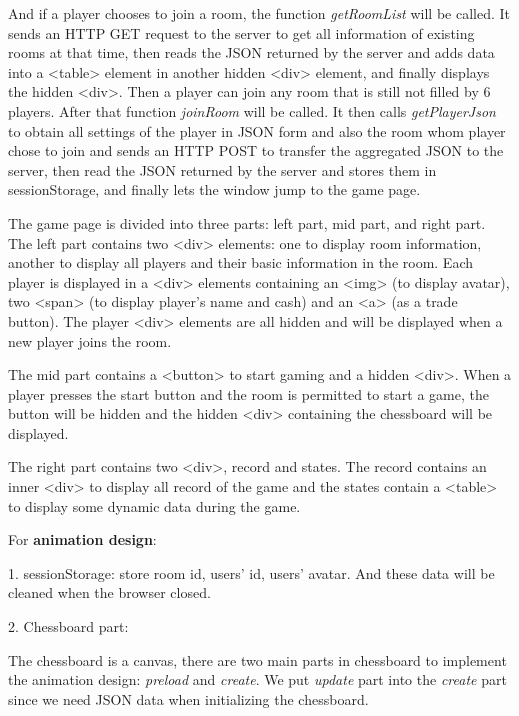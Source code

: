 \documentclass[a4paper,11pt]{article}
\begin{document}
And if a player chooses to join a room, the function \emph{getRoomList} will be called. It sends an HTTP GET request to the server to get all information of existing rooms at that time, then reads the JSON returned by the server and adds data into a \textless table\textgreater\; element in another hidden \textless div\textgreater\; element, and finally displays the hidden \textless div\textgreater\;. Then a player can join any room that is still not filled by $6$ players. After that function \emph{joinRoom} will be called. It then calls \emph{getPlayerJson} to obtain all settings of the player in JSON form and also the room whom player chose to join and sends an HTTP POST to transfer the aggregated JSON to the server, then read the JSON returned by the server and stores them in sessionStorage, and finally lets the window jump to the game page.
    
The game page is divided into three parts: left part, mid part, and right part. The left part contains two \textless div\textgreater\; elements: one to display room information, another to display all players and their basic information in the room. Each player is displayed in a \textless div\textgreater\; elements containing an \textless img\textgreater\; (to display avatar), two \textless span\textgreater\; (to display player's name and cash) and an \textless a\textgreater\; (as a trade button). The player \textless div\textgreater\; elements are all hidden and will be displayed when a new player joins the room. 

The mid part contains a \textless button\textgreater\; to start gaming and a hidden \textless div\textgreater\;. When a player presses the start button and the room is permitted to start a game, the button will be hidden and the hidden \textless div\textgreater\; containing the chessboard will be displayed. 

The right part contains two \textless div\textgreater\;, record and states. The record contains an inner \textless div\textgreater\; to display all record of the game and the states contain a \textless table\textgreater\; to display some dynamic data during the game.


For \textbf{animation design}:

1.	sessionStorage: store room id, users' id, users' avatar. And these data will be cleaned when the browser closed.

2.	Chessboard part:

    The chessboard is a canvas, there are two main parts in chessboard to implement the animation design: \emph{preload} and \emph{create}. We put \emph{update} part into the \emph{create} part since we need JSON data when initializing the chessboard.
    
\end{document}
